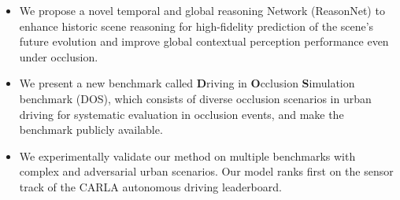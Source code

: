 \documentclass[10pt,twocolumn,letterpaper]{article}
\begin{document}
\begin{itemize}
    \item We propose a novel temporal and global reasoning Network (ReasonNet) to enhance historic scene reasoning for high-fidelity prediction of the scene's future evolution and improve global contextual perception performance even under occlusion.
    \item We present a new benchmark called \textbf{D}riving in \textbf{O}cclusion \textbf{S}imulation benchmark (DOS), which consists of diverse occlusion scenarios in urban driving for systematic evaluation in occlusion events, and make the benchmark publicly available.
    \item We experimentally validate our method on multiple benchmarks with complex and adversarial urban scenarios. Our model ranks first on the sensor track of the CARLA autonomous driving leaderboard.
\end{itemize}
\end{document}
